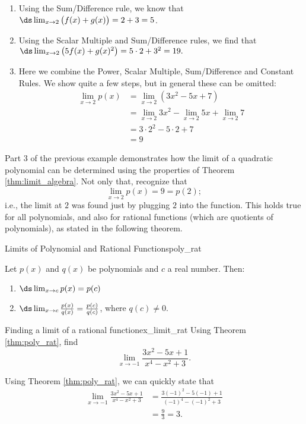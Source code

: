 \begin{solution}
{\begin{enumerate}
\item		Using the Sum/Difference rule, we know that $\ds \lim_{x\to 2} \big(f(x) + g(x)\big) = 2+3 =5$.
\item		Using the Scalar Multiple and Sum/Difference rules, we find that $\ds \lim_{x\to 2} \big(5f(x) + g(x)^2\big) = 5\cdot 2 + 3^2 = 19.$
\item		Here we combine the Power, Scalar Multiple, Sum/Difference and Constant Rules. We show quite a few steps, but in general these can be omitted:
				\begin{align*}
				\lim_{x\to 2} p(x) &= \lim_{x\to 2} (3x^2-5x+7) \\
				&= \lim_{x\to 2} 3x^2-\lim_{x\to 2} 5x+\lim_{x\to 2}7 \\
				 &= 3\cdot 2^2 - 5\cdot 2+7 \\
				 &= 9
				\end{align*}
\end{enumerate}
}
\end{solution}



%
Part 3 of the previous example demonstrates how the limit of a quadratic polynomial can be determined using the properties of Theorem \ref{thm:limit_algebra}. Not only that, recognize that $$\lim_{x\to 2} p(x) = 9 = p(2);$$ i.e., the limit at $ 2 $ was found just by plugging $ 2 $ into the function. This holds true for all polynomials, and also for rational functions (which are quotients of polynomials), as stated in the following theorem.


\begin{theorem}{Limits of Polynomial and Rational Functions}{poly_rat}
{Let $p(x)$ and $q(x)$ be polynomials and $c$ a real number. Then:
\begin{enumerate}
\item	$\ds \lim_{x\to c} p(x) = p(c)$
\item	$\ds \lim_{x\to c} \frac{p(x)}{q(x)} = \frac{p(c)}{q(c)}$, where $q(c) \neq 0$.
\end{enumerate}
}
\end{theorem}

\begin{example}{Finding a limit of a rational function}{ex_limit_rat}
{
Using Theorem \ref{thm:poly_rat}, find $$\lim_{x\to -1} \frac{3x^2-5x+1}{x^4-x^2+3}.$$}
\end{example}


\begin{solution}
{Using Theorem \ref{thm:poly_rat}, we can quickly state that 
	\begin{align*} \lim_{x\to -1}\frac{3x^2-5x+1}{x^4-x^2+3} &= \frac{3(-1)^2-5(-1)+1}{(-1)^4-(-1)^2+3} \\
												&= \frac{9}{3} =3.
	\end{align*}
}
\end{solution}




